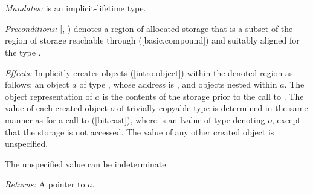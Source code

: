 \begin{adjustwidth}{0.5cm}{0.5cm}
\small{} \\
\small{} \\
\small{} \\
\small{} \\
\small{} \\
\small{} \\
\small{} \\
\small{}

\emph{Mandates:}  is an implicit-lifetime type.

\emph{Preconditions:} [, ) denotes a region of allocated storage that is a subset of the region of storage reachable through ([basic.compound])  and suitably aligned for the type .

\emph{Effects:} Implicitly creates objects ([intro.object]) within the denoted region as follows: an object $a$ of type , whose address is , and objects nested within $a$. The object representation of $a$ is the contents of the storage prior to the call to . The value of each created object $o$ of trivially-copyable type  is determined in the same manner as for a call to  ([bit.cast]), where  is an lvalue of type  denoting $o$, except that the storage is not accessed. The value of any other created object is unspecified. \begin{note}The unspecified value can be indeterminate.\end{note}

\emph{Returns:} A pointer to $a$.

\pagebreak %

\small{} \\
\small{} \\
\small{} \\
\small{} \\
\small{} \\
\small{} \\
\small{} \\
\small{}



\end{adjustwidth}
